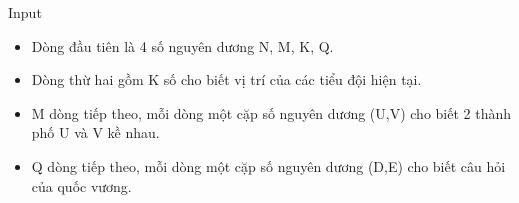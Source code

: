 Input  
\begin{itemize}
	\item     Dòng đầu tiên là 4 số nguyên dương N, M, K, Q.   
	\item     Dòng thừ hai gồm K số cho biết vị trí của các tiểu đội hiện tại.   
	\item     M dòng tiếp theo, mỗi dòng một cặp số nguyên dương (U,V) cho biết 2 thành phố U và V kề nhau.   
	\item     Q dòng tiếp theo, mỗi dòng một cặp số nguyên dương (D,E) cho biết câu hỏi của quốc vương.   
\end{itemize}